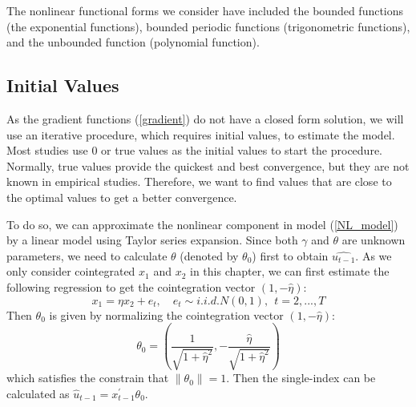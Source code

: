 \documentclass[a4paper,12pt,times,numbered,print,index]{report}
\numberwithin{equation}{section}
\begin{document}
The nonlinear functional forms we consider have included the bounded functions (the exponential functions), bounded periodic functions (trigonometric functions), and the unbounded function (polynomial function). 

\subsection{Initial Values}

As the gradient functions (\ref{gradient}) do not have a closed form solution, we will use an iterative procedure, which requires initial values, to estimate the model. Most studies use 0 or true values as the initial values to start the procedure. Normally, true values provide the quickest and best convergence, but they are not known in empirical studies. Therefore, we want to find values that are close to the optimal values to get a better convergence. 

To do so, we can approximate the nonlinear component in model (\ref{NL_model}) by a linear model using Taylor series expansion. Since both $\gamma$ and $\theta$ are unknown parameters, we need to calculate $\theta$ (denoted by $\theta_0$) first to obtain $\hat{u_{t-1}}$. As we only consider cointegrated $x_1$ and $x_2$ in this chapter, we can first estimate the following regression to get the cointegration vector $(1,-\hat{\eta})$:
$$
x_1 =\eta x_2 + e_t, \quad e_{t}\sim i.i.d.N\left( 0,1\right) ,\ \ t=2,...,T
$$
Then $\theta_0$ is given by normalizing the cointegration vector $(1,-\hat{\eta})$:
$$
\theta_{0} = (\dfrac{1}{\sqrt{1+\hat{\eta}^2}}, -\dfrac{\hat{\eta}}{\sqrt{1+\hat{\eta}^2}})
$$
which satisfies the constrain that $\|\theta_0\| = 1$. Then the single-index can be calculated as $\hat{u}_{t-1} = x^{\prime}_{t-1}\theta_0$.   



\end{document}
